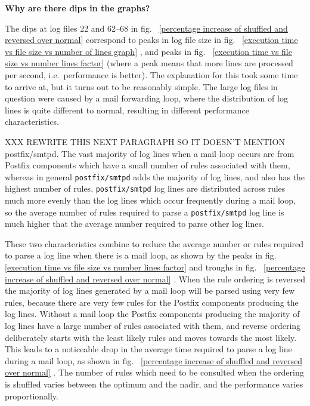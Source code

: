 \documentclass[draft]{svmult}
\newcommand{\refwithpage}[1]{%
    \empty{}\vref{#1}%
}
\newcommand{\daemon}[1]{%
    \texttt{postfix/#1}%
}
\begin{document}
\noindent\textbf{Why are there dips in the graphs?}

\label{Why are there dips in the graphs?}

The dips at log files 22 and 62--68 in fig.~\refwithpage{percentage
increase of shuffled and reversed over normal} correspond to peaks in log
file size in fig.~\refwithpage{execution time vs file size vs number of
lines graph}, and peaks in fig.~\refwithpage{execution time vs file size vs
number lines factor} (where a peak means that more lines are processed per
second, i.e.\ performance is better).  The explanation for this took some
time to arrive at, but it turns out to be reasonably simple.  The large log
files in question were caused by a mail forwarding loop, where the
distribution of log lines is quite different to normal, resulting in
different performance characteristics.

XXX REWRITE THIS NEXT PARAGRAPH SO IT DOESN'T MENTION postfix/smtpd.  The
vast majority of log lines when a mail loop occurs are from Postfix
components which have a small number of rules associated with them, whereas
in general \daemon{smtpd} adds the majority of log lines, and also has the
highest number of rules.  \daemon{smtpd} log lines are distributed across
rules much more evenly than the log lines which occur frequently during a
mail loop, so the average number of rules required to parse a
\daemon{smtpd} log line is much higher that the average number required to
parse other log lines.

These two characteristics combine to reduce the average number or rules
required to parse a log line when there is a mail loop, as shown by the
peaks in fig.~\refwithpage{execution time vs file size vs number lines
factor} and troughs in fig.~\refwithpage{percentage increase of shuffled
and reversed over normal}.  When the rule ordering is reversed the majority
of log lines generated by a mail loop will be parsed using very few rules,
because there are very few rules for the Postfix components producing the
log lines.  Without a mail loop the Postfix components producing the
majority of log lines have a large number of rules associated with them,
and reverse ordering deliberately starts with the least likely rules and
moves towards the most likely.  This leads to a noticeable drop in the
average time required to parse a log line during a mail loop, as shown in
fig.~\refwithpage{percentage increase of shuffled and reversed over
normal}.  The number of rules which need to be consulted when the ordering
is shuffled varies between the optimum and the nadir, and the performance
varies proportionally.
\end{document}
